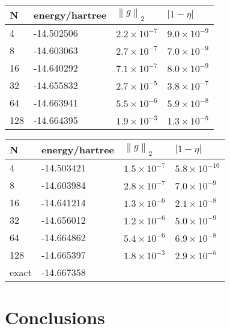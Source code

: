 \documentclass[12pt,thmsa,suthesis,verbatim]{report}
\begin{document}
\begin{tabular}{llll}
\hline\hline
N & energy/hartree & $\left\| g\right\| _2$ & $\left| 1-\eta \right| $ \\ 
\hline
4 & -14.502506 & $2.2\times 10^{-7}$ & $9.0\times 10^{-9}$ \\ 
8 & -14.603063 & $2.7\times 10^{-7}$ & $7.0\times 10^{-9}$ \\ 
16 & -14.640292 & $7.1\times 10^{-7}$ & $8.0\times 10^{-9}$ \\ 
32 & -14.655832 & $2.7\times 10^{-5}$ & $3.8\times 10^{-7}$ \\ 
64 & -14.663941 & $5.5\times 10^{-6}$ & $5.9\times 10^{-8}$ \\ 
128 & -14.664395 & $1.9\times 10^{-3}$ & $1.3\times 10^{-5}$ \\ \hline\hline
\end{tabular}
\caption{$ ^{9}$Be energy calculations using from 4 to 128 basis functions
 Optimization using TN\label{Be9eng}}

\begin{tabular}{llll}
\hline\hline
N & energy/hartree & $\left\| g\right\| _2$ & $\left| 1-\eta \right| $ \\ 
\hline
4 & -14.503421 & $1.5\times 10^{-7}$ & $5.8\times 10^{-10}$ \\ 
8 & -14.603984 & $2.8\times 10^{-7}$ & $7.0\times 10^{-9}$ \\ 
16 & -14.641214 & $1.3\times 10^{-6}$ & $2.1\times 10^{-8}$ \\ 
32 & -14.656012 & $1.2\times 10^{-6}$ & $5.0\times 10^{-9}$ \\ 
64 & -14.664862 & $5.4\times 10^{-6}$ & $6.9\times 10^{-8}$ \\ 
128 & -14.665397 & $1.8\times 10^{-3}$ & $2.9\times 10^{-5}$ \\ 
exact\cite{Bunge76} & -14.667358 &  &  \\ \hline\hline
\end{tabular}
\caption{$ ^{\infty}$Be energy calculations using from 4 to 128 basis functions
 Optimization using TN\label{Beeng}}

\section{Conclusions}
\end{document}
